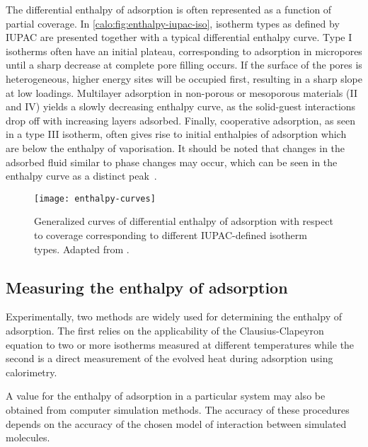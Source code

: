 The differential enthalpy of adsorption is often represented as a
function of partial coverage. In \autoref{calo:fig:enthalpy-iupac-iso},
isotherm types as defined by IUPAC are presented together with
a typical differential enthalpy curve. Type I isotherms often 
have an initial plateau, corresponding to adsorption in micropores
until a sharp decrease at complete pore filling occurs. If the surface
of the pores is heterogeneous, higher energy sites will be occupied
first, resulting in a sharp slope at low loadings. Multilayer
adsorption in non-porous or mesoporous materials (II and IV) yields
a slowly decreasing enthalpy curve, as the solid-guest interactions
drop off with increasing layers adsorbed. Finally, cooperative adsorption,
as seen in a type III isotherm, often gives rise to initial enthalpies
of adsorption which are below the enthalpy of vaporisation.
It should be noted that changes in the adsorbed fluid similar 
to phase changes may occur, which can be seen in the enthalpy curve
as a distinct peak~\cite{llewellynAdsorptionMFItypeZeolites1993, %
llewellynAdsorptionMFItypeZeolites1993a}.

\begin{figure}[htb]
  \centering

  \texttt{[image: enthalpy-curves]}
  \caption{
    Generalized curves of differential enthalpy of adsorption with 
    respect to coverage corresponding to different 
    IUPAC-defined isotherm types.
    Adapted from \citeauthor{llewellynGasAdsorptionMicrocalorimetry2005}%
    \cite{llewellynGasAdsorptionMicrocalorimetry2005}.
  }%
  \label{calo:fig:enthalpy-iupac-iso}

\end{figure}

\subsection{Measuring the enthalpy of adsorption}

Experimentally, two methods are widely used for determining the 
enthalpy of adsorption. The first relies on the applicability of the 
Clausius-Clapeyron equation to two or more isotherms measured 
at different temperatures while the second is a 
direct measurement of the evolved heat during adsorption 
using calorimetry.

A value for the enthalpy of adsorption in a particular system
may also be obtained from computer simulation methods. 
The accuracy of these procedures depends on the accuracy of
the chosen model of interaction between simulated molecules.

